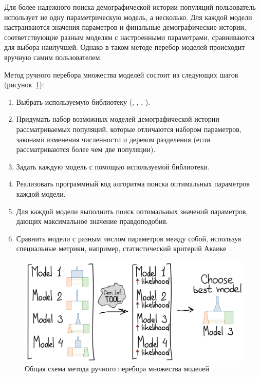 \documentclass[a4paper,14pt,oneside,openany,article]{memoir}
\begin{document}
Для более надежного поиска демографической истории популяций пользователь использует не одну параметрическую модель, а несколько.
Для каждой модели настраиваются значения параметров и финальные демографические истории, соответствующие разным моделям с настроенными параметрами, сравниваются для выбора наилучшей.
Однако в таком методе перебор моделей происходит вручную самим пользователем.

Метод ручного перебора множества моделей состоит из следующих шагов (рисунок~\ref{fig:old_method:scheme}):
\begin{enumerate}
    \item Выбрать используемую библиотеку (\dadi, \moments, \momentsLD, \momi).
    \item Придумать набор возможных моделей демографической истории рассматриваемых популяций, которые отличаются набором параметров, законами изменения численности и деревом разделения (если рассматриваются более чем две популяции).
    \item Задать каждую модель с помощью используемой библиотеки.
    \item Реализовать программный код алгоритма поиска оптимальных параметров каждой модели.
    \item Для каждой модели выполнить поиск оптимальных значений параметров, дающих максимальное значение правдоподобия.
    \item Сравнить модели с разным числом параметров между собой, используя специальные метрики, например, статистический критерий Акаике~.\\
\end{enumerate}

\begin{figure}[h]
    \centering
    \includegraphics[width=\linewidth]{images_2/model_specifition.png}
    \caption{Общая схема метода ручного перебора множества моделей}
    \label{fig:old_method:scheme}
\end{figure}
\end{document}
